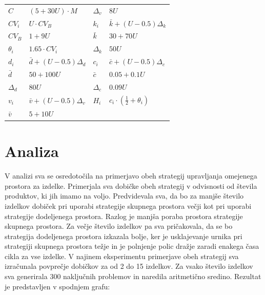 \documentclass[a4paper]{article}
\begin{document}
\begin{tabular}{ l l | l l }
	\hline
  $C$ & $(5 + 30 U) \cdot M$ & $ \Delta_v $ & $8 U$\\
  $CV_i$ & $U \cdot CV_B$ & $k_i$ & $\bar{k} + (U - 0.5) \Delta_k$\\
  $CV_B$ & $1 + 9 U$ & $ \bar{k}$ & $30 + 70 U$\\
  $\theta_i$ & $ 1.65 \cdot CV_i$ & $ \Delta_k$ & $50 U$\\
  $d_i$ & $\bar{d} + (U - 0.5) \Delta_d$ & $ c_i$ & $\bar{c} + (U - 0.5) \Delta_c$\\
  $\bar{d}$ & $50 + 100 U$ & $\bar{c}$ & $ 0.05 + 0.1 U$\\
  $\Delta_d$ & $80 U$ & $\Delta_c$ & $0.09 U$\\
  $ v_i$ & $\bar{v} + (U - 0.5) \Delta_v$ & $H_i$ & $ c_i \cdot (\frac{1}{2} + \theta_i)$\\
  $ \bar{v}$ & $ 5 + 10 U$ & &\\
	\hline
\end{tabular}


\section{Analiza}

V analizi sva se osredotočila na primerjavo obeh strategij upravljanja omejenega prostora za izdelke. Primerjala sva dobičke obeh strategij v odvisnosti od števila produktov, ki jih imamo na voljo. Predvidevala sva, da bo za manjše število izdelkov dobiček pri uporabi strategije skupnega prostora večji kot pri uporabi strategije dodeljenega prostora. Razlog je manjša poraba prostora strategije skupnega prostora. Za večje število izdelkov pa sva pričakovala, da se bo strategija dodeljenega prostora izkazala bolje, ker je usklajevanje urnika pri strategiji skupnega prostora težje in je polnjenje polic dražje zaradi enakega časa cikla za vse izdelke. V najinem eksperimentu primerjave obeh strategij sva izračunala povprečje dobičkov za od 2 do 15 izdelkov. Za vsako število izdelkov sva generirala 300 naključnih problemov in naredila aritmetično sredino. Rezultat je predstavljen v spodnjem grafu:
\end{document}
